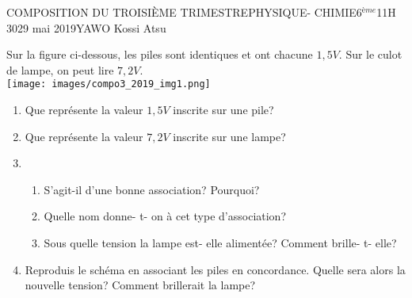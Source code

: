 \documentclass[12pt,a4paper]{book}
\newcommand{\prof}{YAWO Kossi Atsu}
\newcommand{\matiere}{PHYSIQUE- CHIMIE}
\newcommand{\classe}{6$^{ème}$}
\begin{document}
\begin{devoir}{COMPOSITION DU TROISIÈME TRIMESTRE}{\matiere}{\classe}{1}{1H 30}{29 mai 2019}{\prof}
\begin{exo}[4,5]
Sur la figure ci-dessous, les piles sont identiques et ont chacune $1,5V$. Sur le culot de lampe, on peut lire $7,2V$.\\
\texttt{[image: images/compo3\_2019\_img1.png]}
\begin{enumerate}
\item Que représente la valeur $1,5V$ inscrite sur une pile?
\item Que représente la valeur $7,2V$ inscrite sur une lampe?
\item \begin{enumerate}
\item S'agit-il d'une bonne association? Pourquoi?
\item Quelle nom donne- t- on à cet type d'association?
\item Sous quelle tension la lampe est- elle alimentée? Comment brille- t- elle?
\end{enumerate}
\item Reproduis le schéma en associant les piles en concordance. Quelle sera alors la nouvelle tension? Comment brillerait la lampe?
\end{enumerate}

\vspace{0.2cm}
\end{exo}

\tableofcompetences
\end{devoir}
\end{document}

